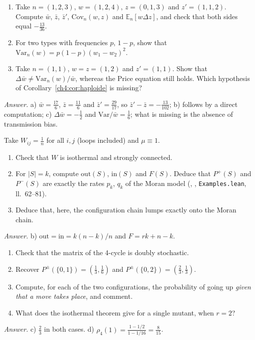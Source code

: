 \begin{exercise}
\begin{enumerate}[label=\alph*),itemsep=0pt]
\item Take $n=(1,2,3)$, $w=(1,2,4)$, $z=(0,1,3)$ and $z'=(1,1,2)$. Compute $\bar w$, $\bar z$, $\bar z'$,
$\mathrm{Cov}_n(w,z)$ and $\mathbb E_n[w\Delta z]$, and check that both sides equal $-\frac{13}{36}$.
\item For two types with frequencies $p$, $1-p$, show that $\mathrm{Var}_n(w)=p(1-p)(w_1-w_2)^2$.
\item Take $n=(1,1)$, $w=z=(1,2)$ and $z'=(1,1)$. Show that $\Delta\bar w\ne\mathrm{Var}_n(w)/\bar w$, whereas
the Price equation still holds. Which hypothesis of Corollary~\ref{ch4:cor:haploide} is missing?
\end{enumerate}
\emph{Answer.} a) $\bar w=\frac{17}6$, $\bar z=\frac{11}6$ and $\bar z'=\frac{29}{17}$, so
$\bar z'-\bar z=-\frac{13}{102}$; b) follows by a direct
computation; c) $\Delta\bar w=-\frac12$ and $\mathrm{Var}/\bar w=\frac16$; what is missing is the absence of transmission
bias.
\end{exercise}

\begin{exercise}
Take $W_{ij}=\frac1n$ for all $i,j$ (loops included) and $\mu\equiv1$.
\begin{enumerate}[label=\alph*),itemsep=0pt]
\item Check that $W$ is isothermal and strongly connected.
\item For $|S|=k$, compute $\mathrm{out}(S)$, $\mathrm{in}(S)$ and $F(S)$. Deduce that $P^{+}(S)$ and $P^{-}(S)$
are exactly the rates $p_k$, $q_k$ of the Moran model (, ,
\texttt{Examples.lean}, ll.~62--81).
\item Deduce that, here, the configuration chain lumps exactly onto the Moran chain.
\end{enumerate}
\emph{Answer.} b) $\mathrm{out}=\mathrm{in}=k(n-k)/n$ and $F=rk+n-k$.
\end{exercise}

\begin{exercise}
\begin{enumerate}[label=\alph*),itemsep=0pt]
\item Check that the matrix of the 4-cycle is doubly stochastic.
\item Recover $P^{\pm}(\{0,1\})=(\frac13,\frac16)$ and $P^{\pm}(\{0,2\})=(\frac23,\frac13)$.
\item Compute, for each of the two configurations, the probability of going up \emph{given that a move takes
place}, and comment.
\item What does the isothermal theorem give for a single mutant, when $r=2$?
\end{enumerate}
\emph{Answer.} c) $\frac23$ in both cases. d) $\rho_4(1)=\frac{1-1/2}{1-1/16}=\frac8{15}$.
\end{exercise}


